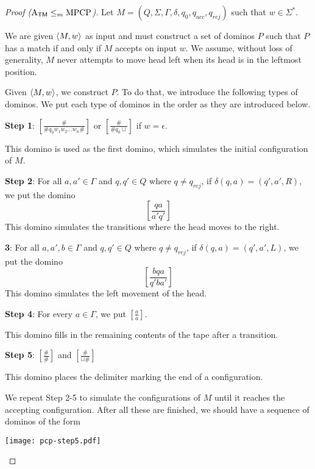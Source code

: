 \begin{proof}[Proof \hspace{0.1em} ($\mathrm{A}_{\mathsf{TM}} \leq_m \mathrm{MPCP}$)]
    Let $M = (Q,\Sigma,\Gamma,\delta,q_0,q_{acc},q_{rej})$ such that $w \in \Sigma^*$.

    We are given $\langle M,w \rangle$ as input and must construct a set of dominos $P$ such that $P$ has a match if and only if $M$ accepts on input $w$. We assume, without loss of generality, $M$ never attempts to move head left when its head is in the leftmost position.

    Given $\langle M,w \rangle$, we construct $P$. To do that, we introduce the following types of dominos. We put each type of dominos in the order as they are introduced below.

    \textbf{Step 1}: $\displaystyle \left[ \frac{\#}{\# q_0 w_1 w_2 \ldots w_n \#} \right]$ or $\displaystyle \left[ \frac{\#}{\# q_0 \sqcup} \right]$ if $w = \epsilon$.

    This domino is used as the first domino, which simulates the initial configuration of $M$.

    \textbf{Step 2}: For all $a,a' \in \Gamma$ and $q,q' \in Q$ where $q \neq q_{rej}$, if $\delta(q,a) = (q',a',R)$, we put the domino
    $$
    \left[ \frac{qa}{a'q'} \right] 
    $$
    This domino simulates the transitions where the head moves to the right.

    \textbf{ 3}: For all $a,a',b \in \Gamma$ and $q,q' \in Q$ where $q \neq q_{rej}$, if $\delta(q,a) = (q',a',L)$, we put the domino
    $$
    \left[ \frac{bqa}{q'ba'} \right] 
    $$
    This domino simulates the left movement of the head.

    \textbf{Step 4}: For every $a \in \Gamma$, we put $\displaystyle \left[ \frac{a}{a}\right]$.
    
    This domino fills in the remaining contents of the tape after a transition.

    \textbf{Step 5}: $\displaystyle \left[ \frac{\#}{\#} \right]$ and $\displaystyle \left[ \frac{\#}{\sqcup\#} \right]$
    
    This domino places the delimiter marking the end of a configuration.

    We repeat Step 2-5 to simulate the configurations of $M$ until it reaches the accepting configuration. After all these are finished, we should have a sequence of dominos of the form

    \begin{center}
        \texttt{[image: pcp-step5.pdf]}
    \end{center}


\end{proof}
